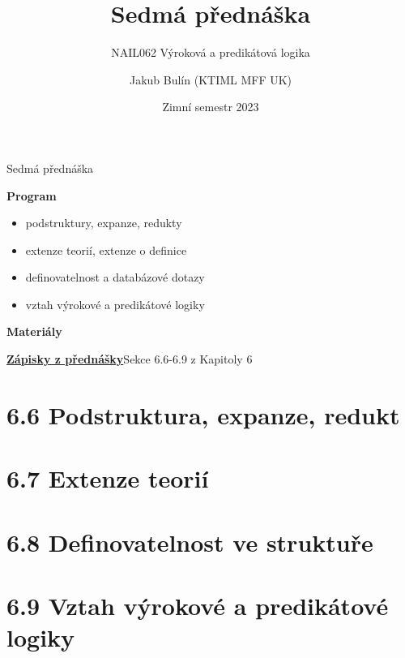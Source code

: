 \documentclass{beamer}
\title{Sedmá přednáška}
\subtitle{NAIL062 Výroková a predikátová logika}
\author{Jakub Bulín (KTIML MFF UK)}
\date{Zimní semestr 2023}
\begin{document}
\frame{\titlepage}


\begin{frame}{Sedmá přednáška}

    \textbf{Program}
        \begin{itemize}
            \item podstruktury, expanze, redukty           
            \item extenze teorií, extenze o definice
            \item definovatelnost a databázové dotazy
            \item vztah výrokové a predikátové logiky
        \end{itemize}

    \textbf{Materiály}

        \href{https://github.com/jbulin-mff-uk/nail062/raw/main/lecture/lecture-notes/lecture-notes.pdf}{\alert{\textbf{Zápisky z přednášky}}}Sekce 6.6-6.9 z Kapitoly 6

\end{frame}


\section{6.6 Podstruktura, expanze, redukt}


\section{6.7 Extenze teorií}


\section{6.8 Definovatelnost ve struktuře}


\section{6.9 Vztah výrokové a predikátové logiky}
\end{document}

